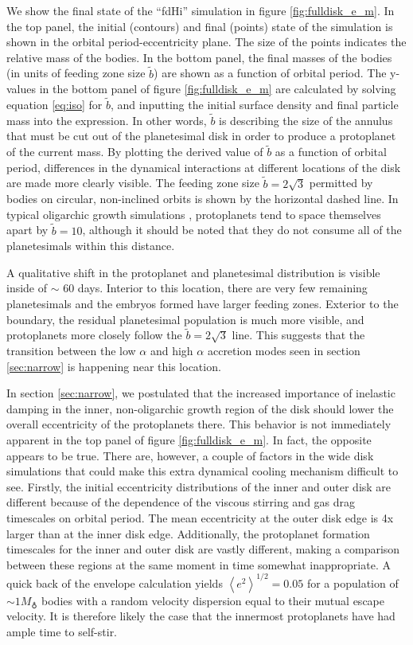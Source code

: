 We show the final state of the ``fdHi'' simulation in figure \ref{fig:fulldisk_e_m}. In the top panel,
the initial (contours) and final (points) state of the simulation is
shown in the orbital period-eccentricity plane. The size of the points
indicates the relative mass of the bodies. In the bottom panel, the
final masses of the bodies (in units of feeding zone size $\tilde{b}$) are shown
as a function of orbital period. The y-values in the bottom panel of figure \ref{fig:fulldisk_e_m} are calculated by solving equation \ref{eq:iso} for $\tilde{b}$, and inputting the initial surface density and final particle mass into the expression. In other words, $\tilde{b}$ is describing the size of the annulus that must be cut out of the planetesimal disk in order to produce a protoplanet of the current mass. By plotting the derived value of $
\tilde{b}$ as a function of orbital period, differences in the dynamical interactions at different locations of the disk are made more 
clearly visible. The feeding zone size $\tilde{b} = 2 \sqrt{3}$ permitted by bodies on circular, non-inclined orbits \cite{naka88} is shown by the
horizontal dashed line. In typical oligarchic growth simulations \cite{kokubo98}, protoplanets tend 
to space themselves apart by $\tilde{b} = 10$, although it should be noted that they do not consume all of the planetesimals 
within this distance.

A qualitative shift in the protoplanet and planetesimal distribution is visible inside of $\sim$ 60 days. Interior to this location, there are 
very few remaining planetesimals and the embryos formed have larger feeding zones. Exterior to the boundary, the residual 
planetesimal population is much more visible, and protoplanets more closely follow the $\tilde{b} = 2 \sqrt{3}$ line. This 
suggests that the transition between the low $\alpha$ and high $\alpha$ accretion modes seen in section \ref{sec:narrow} 
is happening near this location.

In section \ref{sec:narrow}, we postulated that the increased importance of inelastic damping in the inner, non-oligarchic growth 
region of the disk should lower the overall eccentricity of the protoplanets there. This behavior is not immediately apparent in the 
top panel of figure \ref{fig:fulldisk_e_m}. In fact, the opposite appears to be true. There are, however, a couple of factors in the wide disk simulations that could make this 
extra dynamical cooling mechanism difficult to see. Firstly, the initial eccentricity distributions of the inner and outer disk are 
different because of the dependence of the viscous stirring and gas drag timescales on orbital period. The mean eccentricity at the outer disk edge is 4x larger than at the inner disk edge. Additionally, the 
protoplanet formation timescales for the inner and outer disk are vastly different, making a comparison between these regions at 
the same moment in time somewhat inappropriate. A quick back of the envelope calculation yields $\left< e^2 \right>^{1/2} = 0.05$ for a population of $\sim 1 M_{\earth}$ bodies with a random velocity dispersion equal to their mutual escape velocity. It is therefore likely the case that the innermost protoplanets have had ample time to self-stir.

